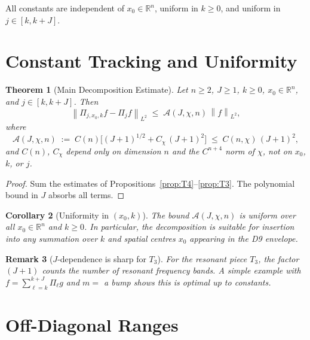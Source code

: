 \documentclass[11pt,a4paper]{article}
\newtheorem{theorem}{Theorem}[section]
\newtheorem{corollary}[theorem]{Corollary}
\newtheorem{remark}[theorem]{Remark}
\newcommand{\R}{\mathbb{R}}
\newcommand{\norm}[2]{\left\|#1\right\|_{#2}}
\begin{document}
All constants are independent of $x_0 \in \R^n$, uniform in $k \geq 0$,
and uniform in $j \in [k, k+J]$.

\section{Constant Tracking and Uniformity}
\label{sec:constants}

\begin{theorem}[Main Decomposition Estimate]
\label{thm:main}
Let $n \geq 2$, $J \geq 1$, $k \geq 0$, $x_0 \in \R^n$, and
$j \in [k, k+J]$.  Then
\[
  \norm{\Pi_{j,x_0,k} f - \Pi_j f}{L^2}
  \;\leq\; \mathcal{A}(J,\chi,n)\,\norm{f}{L^2},
\]
where
\[
  \mathcal{A}(J,\chi,n)
  \;:=\; C(n)\bigl[(J+1)^{1/2}
         + C_{\chi}\,(J+1)^2\bigr]
  \;\leq\; C(n,\chi)\,(J+1)^2,
\]
and $C(n)$, $C_\chi$ depend only on dimension $n$ and the $C^{n+4}$ norm
of $\chi$, \emph{not} on $x_0$, $k$, or $j$.
\end{theorem}

\begin{proof}
Sum the estimates of Propositions~\ref{prop:T4}--\ref{prop:T3}.
The polynomial bound in $J$ absorbs all terms.
\end{proof}

\begin{corollary}[Uniformity in $(x_0, k)$]
The bound $\mathcal{A}(J,\chi,n)$ is uniform over all $x_0 \in \R^n$ and
$k \geq 0$.  In particular, the decomposition is suitable for insertion
into any summation over $k$ and spatial centres $x_0$ appearing in the
D9 envelope.
\end{corollary}

\begin{remark}[$J$-dependence is sharp for $T_3$]
\label{rem:Jsharp}
For the resonant piece $T_3$, the factor $(J+1)$ counts the number of
resonant frequency bands.  A simple example with $f = \sum_{\ell=k}^{k+J}
\Pi_\ell g$ and $m = $ a bump shows this is optimal up to constants.
\end{remark}

\section{Off-Diagonal Ranges}
\label{sec:offdiag}
\end{document}
